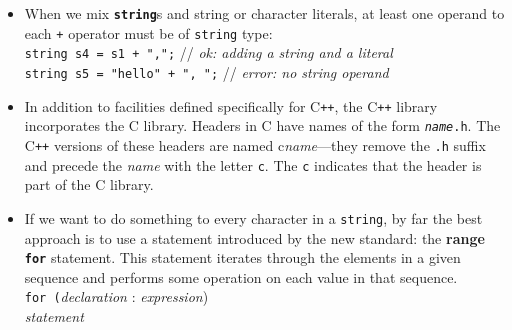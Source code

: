 \begin{itemize}
\item
When we mix \textbf{\texttt{string}}s and string or character literals, at least one operand to each \texttt{+} operator must be of \texttt{string} type:\\
\hspace*{1em}\texttt{string s4 = s1 + ",";} // \textit{ok: adding a string and a literal}\\
\hspace*{1em}\texttt{string s5 = "hello" + ", ";} // \textit{error: no string operand}

\item
In addition to facilities defined specifically for C\texttt{++}, the C\texttt{++} library incorporates the C library. Headers in C have names of the form \texttt{\textit{name}.h}. The C\texttt{++} versions of these headers are named c\textit{name}---they remove the \texttt{.h} suffix and precede the \textit{name} with the letter \texttt{c}. The \texttt{c} indicates that the header is part of the C library.

\item
If we want to do something to every character in a \texttt{string}, by far the best approach is to use a statement introduced by the new standard: the \textbf{range \texttt{for}} statement. This statement iterates through the elements in a given sequence and performs some operation on each value in that sequence.\\
\hspace*{1em}\texttt{for (}\textit{declaration }:\textit{ expression})\\
\hspace*{3em}\textit{statement}


\end{itemize}
